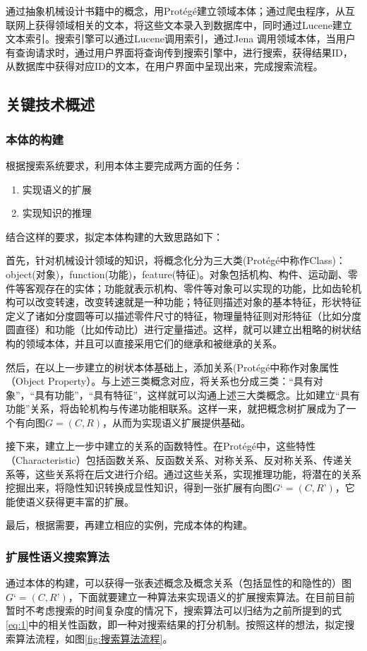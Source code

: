 \documentclass[12pt,a4paper]{article}
\begin{document}
	通过抽象机械设计书籍中的概念，用Prot{\'e}g{\'e}建立领域本体；通过爬虫程序，从互联网上获得领域相关的文本，将这些文本录入到数据库中，同时通过Lucene建立文本索引。搜索引擎可以通过Lucene调用索引，通过Jena 调用领域本体，当用户有查询请求时，通过用户界面将查询传到搜索引擎中，进行搜索，获得结果ID，从数据库中获得对应ID的文本，在用户界面中呈现出来，完成搜索流程。
				
	\subsection{关键技术概述}
		\subsubsection{本体的构建}
	根据搜索系统要求，利用本体主要完成两方面的任务：
	\begin{enumerate}
		\item
		实现语义的扩展
		\item
		实现知识的推理
	\end{enumerate}
	结合这样的要求，拟定本体构建的大致思路如下：
	
	首先，针对机械设计领域的知识，将概念化分为三大类(Prot{\'e}g{\'e}中称作Class)：object(对象)，function(功能)，feature(特征)。对象包括机构、构件、运动副、零件等客观存在的实体；功能就表示机构、零件等对象可以实现的功能，比如齿轮机构可以改变转速，改变转速就是一种功能；特征则描述对象的基本特征，形状特征定义了诸如分度圆等可以描述零件尺寸的特征，物理量特征则对形特征（比如分度圆直径）和功能（比如传动比）进行定量描述。这样，就可以建立出粗略的树状结构的领域本体，并且可以直接采用它们的继承和被继承的关系。
	
	然后，在以上一步建立的树状本体基础上，添加关系(Prot{\'e}g{\'e}中称作对象属性（Object Property）。与上述三类概念对应，将关系也分成三类：“具有对象”，“具有功能”，“具有特征”，这样就可以沟通上述三大类概念。比如建立“具有功能”关系，将齿轮机构与传递功能相联系。这样一来，就把概念树扩展成为了一个有向图$ G=(C, R) $，从而为实现语义扩展提供基础。
	
	接下来，建立上一步中建立的关系的函数特性。在Prot{\'e}g{\'e}中，这些特性（Characteristic）包括函数关系、反函数关系、对称关系、反对称关系、传递关系等，这些关系将在后文进行介绍。通过这些关系，实现推理功能，将潜在的关系挖掘出来，将隐性知识转换成显性知识，得到一张扩展有向图$ G‘=(C, R’) $，它能使语义获得更丰富的扩展。
	
	最后，根据需要，再建立相应的实例，完成本体的构建。
	
		\subsubsection{扩展性语义搜索算法}
	通过本体的构建，可以获得一张表述概念及概念关系（包括显性的和隐性的）图$ G‘=(C, R’) $，下面就要建立一种算法来实现语义的扩展搜索算法。在目前目前暂时不考虑搜索的时间复杂度的情况下，搜索算法可以归结为之前所提到的式\ref{eq:1}中的相关性函数，即一种对搜索结果的打分机制。按照这样的想法，拟定搜索算法流程，如图\ref{fig:搜索算法流程}。
	
\end{document}
